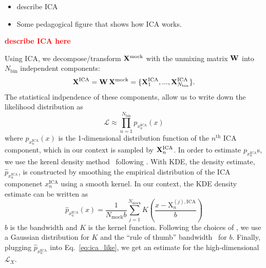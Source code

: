 \documentclass[12pt, letterpaper, preprint]{aastex}
\newcommand{\bitem}{\begin{itemize}}
\newcommand{\eitem}{\end{itemize}}
\newcommand{\beq}{\begin{equation}}
\newcommand{\eeq}{\end{equation}}
\newcommand{\todo}[1]{{\bf \textcolor{red}{#1}}}
\newcommand{\Xmock}{{\bf X}^\mathrm{mock}}
\begin{document}
\bitem
    \item describe ICA 
    \item Some pedagogical figure that shows how ICA works. 
\eitem
\todo{describe ICA here} 

Using ICA, we decompose/transform $\Xmock$ with the unmixing matrix ${\bf W}$ 
into $N_\mathrm{bin}$ independent components: 
\beq
{\bf X}^\mathrm{ICA} = {\bf W}\,\Xmock = \{{\bf X}^\mathrm{ICA}_1, ..., {\bf X}^\mathrm{ICA}_{N_\mathrm{bin}}\}.
\eeq
The statistical indpendence of these components, allow us to write 
down the likelihood distribution as 
\beq \label{eq:ica_like}
\mathcal{L} \approx \prod\limits_{n=1}^{N_\mathrm{bin}} p_{x^\mathrm{ICA}_n} (x) 
\eeq
where $p_{x^\mathrm{ICA}_n} (x)$ is the 1-dimensional distribution 
function of the $n^\mathrm{th}$ ICA component, which in our context 
is sampled by ${\bf X}^\mathrm{ICA}_n$. In order to estimate $p_{x^\mathrm{ICA}_n}$s, 
we use the kerenl density method~\citep[KDE; \emph{e.g.}][]{9780387848587,feigelson2012}
following \cite{hartlap2009}. With KDE, the density estimate,
$\hat{p}_{x^\mathrm{ICA}_n}$, is constructed by 
smoothing the empirical distribution of the ICA componenet $x^\mathrm{ICA}_n$ 
using a smooth kernel. In our context, the KDE density estimate 
can be written as 
\beq
\hat{p}_{x^\mathrm{ICA}_n}(x) = \frac{1}{N_\mathrm{mock}b} \sum\limits_{j=1}^{N_\mathrm{mock}} K \left( \frac{x - \mathrm{X}^{(j),\mathrm{ICA}}_n}{b} \right)
\eeq
$b$ is the bandwidth and $K$ is the kernel function. Following the 
choices of \cite{hartlap2009}, we use a Gaussian distribution for $K$ and the 
``rule of thumb'' bandwidth~\cite[also known as Scott's rule;][]{scott1992,davison2008} 
for $b$. Finally, plugging $\hat{p}_{x^\mathrm{ICA}_n}$ into Eq.~\ref{eq:ica_like}, 
we get an estimate for the high-dimensional $\mathcal{L}_X$.
\end{document}
